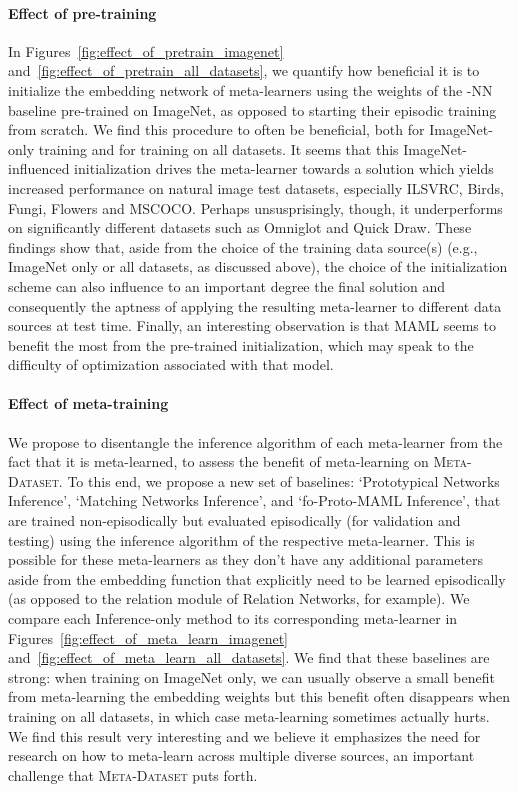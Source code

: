 \documentclass{article} \usepackage{iclr2020_conference,times}
\newcommand{\benchmark}{\textsc{Meta-Dataset}\xspace}
\begin{document}
\paragraph{Effect of pre-training}
In Figures~\ref{fig:effect_of_pretrain_imagenet}
and~\ref{fig:effect_of_pretrain_all_datasets}, we quantify how beneficial it is
to initialize the embedding network of meta-learners using the weights of the -NN
baseline pre-trained on ImageNet, as opposed to starting their episodic training from scratch.
We find this procedure to often be beneficial, both for ImageNet-only training
and for training on all datasets. It seems that this ImageNet-influenced
initialization drives the meta-learner towards a solution which yields
increased performance on natural image test datasets, especially ILSVRC, Birds,
Fungi, Flowers and MSCOCO. Perhaps unsusprisingly, though, it underperforms on
significantly different datasets such as Omniglot and Quick Draw. These
findings show that, aside from the choice of the training data source(s) (e.g.,
ImageNet only or all datasets, as discussed above), the choice of the
initialization scheme can also influence to an important degree the final
solution and consequently the aptness of applying the resulting meta-learner to
different data sources at test time. Finally, an interesting observation is
that MAML seems to benefit the most from the pre-trained initialization, which
may speak to the difficulty of optimization associated with that model.


\paragraph{Effect of meta-training}
We propose to disentangle the inference algorithm of each meta-learner from the
fact that it is meta-learned, to assess the benefit of meta-learning on
\benchmark. To this end, we propose a new set of baselines: `Prototypical
Networks Inference', `Matching Networks Inference', and `fo-Proto-MAML
Inference', that are trained non-episodically but evaluated episodically
(for validation and testing) using the inference algorithm of the respective meta-learner. This
is possible for these meta-learners as they don't have any additional
parameters aside from the embedding function that explicitly need to be learned
episodically (as opposed to the relation module of Relation Networks, for example). We
compare each Inference-only method to its corresponding meta-learner in
Figures~\ref{fig:effect_of_meta_learn_imagenet}
and~\ref{fig:effect_of_meta_learn_all_datasets}.
We find that these baselines are strong: when training on ImageNet only, we can
usually observe a small benefit from meta-learning the embedding weights but
this benefit often disappears when training on all datasets, in which case
meta-learning sometimes actually hurts. We find this result very interesting
and we believe it emphasizes the need for research on how to meta-learn across
multiple diverse sources, an important challenge that \benchmark puts forth.
\end{document}
